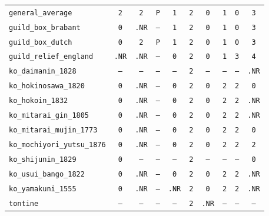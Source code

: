 \documentclass[11pt,a4paper]{article}
\begin{document}
\begin{table}[htbp]
\begin{tabular}{lccccccccc}
\texttt{general\_average} & \texttt{2} & \texttt{2} & \texttt{P} & \texttt{1} & \texttt{2} & \texttt{0} & \texttt{1} & \texttt{0} & \texttt{3} \\
\texttt{guild\_box\_brabant} & \texttt{0} & \texttt{.NR} & \texttt{--} & \texttt{1} & \texttt{2} & \texttt{0} & \texttt{1} & \texttt{0} & \texttt{3} \\
\texttt{guild\_box\_dutch} & \texttt{0} & \texttt{2} & \texttt{P} & \texttt{1} & \texttt{2} & \texttt{0} & \texttt{1} & \texttt{0} & \texttt{3} \\
\texttt{guild\_relief\_england} & \texttt{.NR} & \texttt{.NR} & \texttt{--} & \texttt{0} & \texttt{2} & \texttt{0} & \texttt{1} & \texttt{3} & \texttt{4} \\
\texttt{ko\_daimanin\_1828} & \texttt{--} & \texttt{--} & \texttt{--} & \texttt{--} & \texttt{2} & \texttt{--} & \texttt{--} & \texttt{--} & \texttt{.NR} \\
\texttt{ko\_hokinosawa\_1820} & \texttt{0} & \texttt{.NR} & \texttt{--} & \texttt{0} & \texttt{2} & \texttt{0} & \texttt{2} & \texttt{2} & \texttt{0} \\
\texttt{ko\_hokoin\_1832} & \texttt{0} & \texttt{.NR} & \texttt{--} & \texttt{0} & \texttt{2} & \texttt{0} & \texttt{2} & \texttt{2} & \texttt{.NR} \\
\texttt{ko\_mitarai\_gin\_1805} & \texttt{0} & \texttt{.NR} & \texttt{--} & \texttt{0} & \texttt{2} & \texttt{0} & \texttt{2} & \texttt{2} & \texttt{.NR} \\
\texttt{ko\_mitarai\_mujin\_1773} & \texttt{0} & \texttt{.NR} & \texttt{--} & \texttt{0} & \texttt{2} & \texttt{0} & \texttt{2} & \texttt{2} & \texttt{0} \\
\texttt{ko\_mochiyori\_yutsu\_1876} & \texttt{0} & \texttt{.NR} & \texttt{--} & \texttt{0} & \texttt{2} & \texttt{0} & \texttt{2} & \texttt{2} & \texttt{2} \\
\texttt{ko\_shijunin\_1829} & \texttt{0} & \texttt{--} & \texttt{--} & \texttt{--} & \texttt{2} & \texttt{--} & \texttt{--} & \texttt{--} & \texttt{0} \\
\texttt{ko\_usui\_bango\_1822} & \texttt{0} & \texttt{.NR} & \texttt{--} & \texttt{0} & \texttt{2} & \texttt{0} & \texttt{2} & \texttt{2} & \texttt{.NR} \\
\texttt{ko\_yamakuni\_1555} & \texttt{0} & \texttt{.NR} & \texttt{--} & \texttt{.NR} & \texttt{2} & \texttt{0} & \texttt{2} & \texttt{2} & \texttt{.NR} \\
\texttt{tontine} & \texttt{--} & \texttt{--} & \texttt{--} & \texttt{--} & \texttt{2} & \texttt{.NR} & \texttt{--} & \texttt{--} & \texttt{--} \\

\end{tabular}
\end{table}
\end{document}
